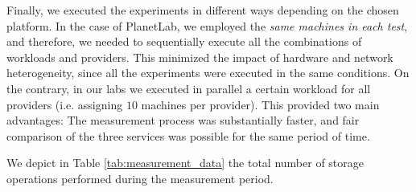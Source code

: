 Finally, we executed the experiments
in different ways depending on the chosen platform. In the case of
PlanetLab, we employed the \textit{same machines in each test}, and therefore, 
we needed to sequentially execute all the combinations of workloads and providers. 
This minimized the impact of hardware and network
heterogeneity, since all the experiments were executed in the same conditions.
On the contrary, in our labs we executed in parallel a certain workload
for all providers (i.e. assigning $10$ machines per provider).
This provided two main advantages: The measurement process was
substantially faster, and fair comparison of the three services
was possible for the same period of time. 
 
We depict in Table \ref{tab:measurement_data} the total 
number of storage operations performed during the measurement period.